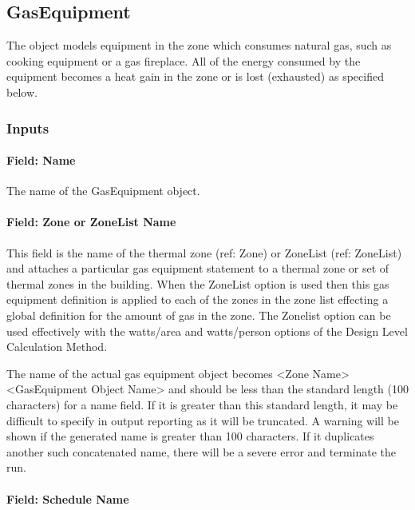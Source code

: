 \subsection{GasEquipment}\label{gasequipment}

The object models equipment in the zone which consumes natural gas, such as cooking equipment or a gas fireplace. All of the energy consumed by the equipment becomes a heat gain in the zone or is lost (exhausted) as specified below.

\subsubsection{Inputs}\label{inputs-4-017}

\paragraph{Field: Name}\label{field-name-4-014}

The name of the GasEquipment object.

\paragraph{Field: Zone or ZoneList Name}\label{field-zone-or-zonelist-name-3}

This field is the name of the thermal zone (ref: Zone) or ZoneList (ref: ZoneList) and attaches a particular gas equipment statement to a thermal zone or set of thermal zones in the building. When the ZoneList option is used then this gas equipment definition is applied to each of the zones in the zone list effecting a global definition for the amount of gas in the zone. The Zonelist option can be used effectively with the watts/area and watts/person options of the Design Level Calculation Method.

The name of the actual gas equipment object becomes \textless{}Zone Name\textgreater{} \textless{}GasEquipment Object Name\textgreater{} and should be less than the standard length (100 characters) for a name field. If it is greater than this standard length, it may be difficult to specify in output reporting as it will be truncated. A warning will be shown if the generated name is greater than 100 characters. If it duplicates another such concatenated name, there will be a severe error and terminate the run.

\paragraph{Field: Schedule Name}\label{field-schedule-name-2-001}

